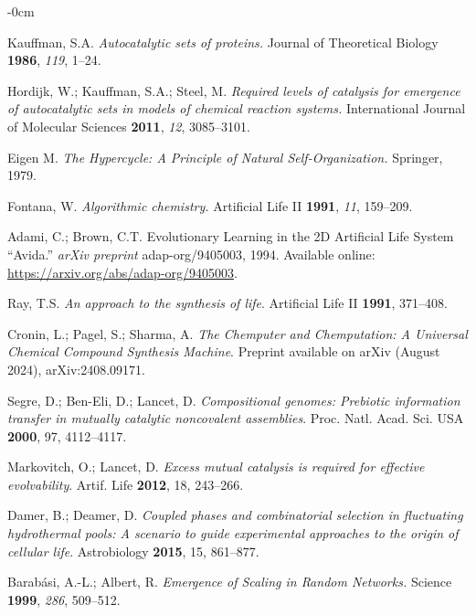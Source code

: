 \documentclass[life,article,submit,pdftex,moreauthors]{Definitions/mdpi}
\begin{document}
\begin{adjustwidth}{-\extralength}{0cm}
{\begin{thebibliography}{999}
Kauffman, S.A. \textit{Autocatalytic sets of proteins.} Journal of Theoretical Biology \textbf{1986}, \textit{119}, 1–24.

Hordijk, W.; Kauffman, S.A.; Steel, M. \textit{Required levels of catalysis for emergence of autocatalytic sets in models of chemical reaction systems.} International Journal of Molecular Sciences \textbf{2011}, \textit{12}, 3085–3101.

Eigen M. \textit{The Hypercycle: A Principle of Natural Self-Organization.} Springer, 1979.

Fontana, W. \textit{Algorithmic chemistry.} Artificial Life II \textbf{1991}, \textit{11}, 159–209.

Adami, C.; Brown, C.T. 
Evolutionary Learning in the 2D Artificial Life System ``Avida.'' 
\textit{arXiv preprint} adap-org/9405003, 1994. Available online: \url{https://arxiv.org/abs/adap-org/9405003}.

Ray, T.S. \textit{An approach to the synthesis of life}. Artificial Life II \textbf{1991}, 371--408.

Cronin, L.; Pagel, S.; Sharma, A. \textit{The Chemputer and Chemputation: A Universal Chemical Compound Synthesis Machine}. Preprint available on arXiv (August 2024), arXiv:2408.09171.

Segre, D.; Ben-Eli, D.; Lancet, D. \textit{Compositional genomes: Prebiotic information transfer in mutually catalytic noncovalent assemblies}. Proc. Natl. Acad. Sci. USA \textbf{2000}, 97, 4112--4117.

Markovitch, O.; Lancet, D. \textit{Excess mutual catalysis is required for effective evolvability}. Artif. Life \textbf{2012}, 18, 243--266.

Damer, B.; Deamer, D. \textit{Coupled phases and combinatorial selection in fluctuating hydrothermal pools: A scenario to guide experimental approaches to the origin of cellular life}. Astrobiology \textbf{2015}, 15, 861--877.

Barabási, A.-L.; Albert, R. \textit{Emergence of Scaling in Random Networks.} Science \textbf{1999}, \textit{286}, 509–512.


\end{thebibliography}}
\end{adjustwidth}
\end{document}
